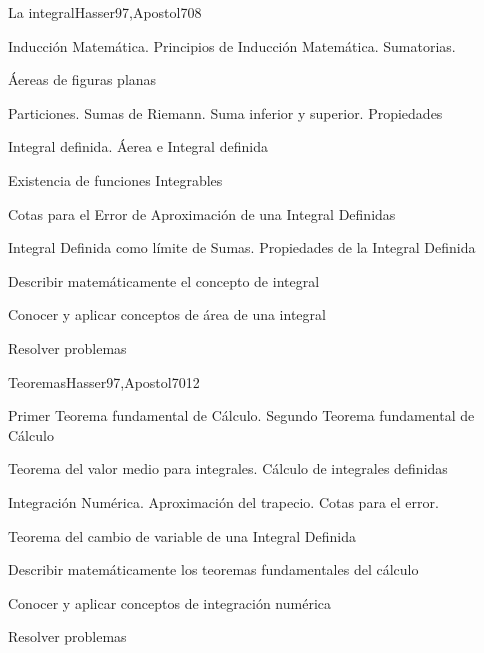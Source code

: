 \begin{syllabus}
\begin{unit}{La integral}{Hasser97,Apostol70}{8}
\begin{topics}
	\item Inducción Matemática. Principios de Inducción Matemática. Sumatorias.
	\item Áereas de figuras planas
	\item Particiones. Sumas de Riemann. Suma inferior y superior. Propiedades
	\item Integral definida. Áerea e Integral definida
	\item Existencia de funciones Integrables
	\item Cotas para el Error de Aproximación de una Integral Definidas
	\item Integral Definida como límite de Sumas. Propiedades de la Integral Definida
\end{topics}
\begin{learningoutcomes}
	\item Describir matemáticamente el concepto de integral
	\item Conocer y aplicar conceptos de área de una integral
	\item Resolver problemas
\end{learningoutcomes}
\end{unit}

\begin{unit}{Teoremas}{Hasser97,Apostol70}{12}
\begin{topics}
      \item Primer Teorema fundamental de Cálculo. Segundo Teorema fundamental de Cálculo
      \item Teorema del valor medio para integrales. Cálculo de integrales definidas
      \item Integración Numérica. Aproximación del trapecio. Cotas para el error.
      \item Teorema del cambio de variable de una Integral Definida
\end{topics}

   \begin{learningoutcomes}
      \item Describir matemáticamente los teoremas fundamentales del cálculo
      \item Conocer y aplicar conceptos de integración numérica
	\item Resolver problemas
   \end{learningoutcomes}
\end{unit}


\end{syllabus}
